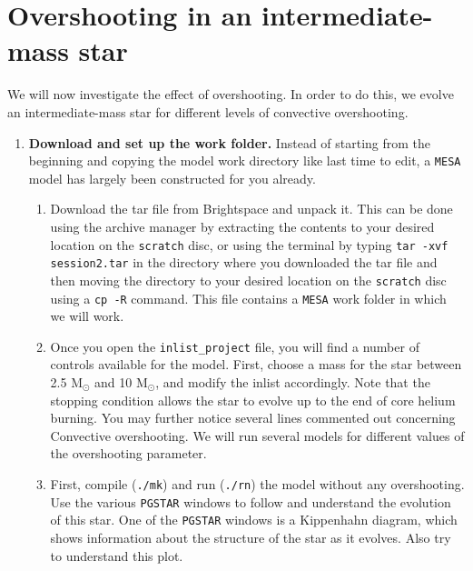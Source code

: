 \documentclass[11pt,a4paper]{article}
\begin{document}
\section{Overshooting in an intermediate-mass star}

We will now investigate the effect of overshooting. In order to do this, we evolve an intermediate-mass star for different levels of convective overshooting.


\begin{enumerate}

\item \textbf{Download and set up the work folder.} 
Instead of starting from the beginning and copying the model work directory like last time to edit, a \texttt{MESA} model has largely been constructed for you already. 


\begin{enumerate} 

    \item Download the tar file from Brightspace and unpack it. This can be done using the archive manager by extracting the contents to your desired location on the \texttt{scratch} disc, or using the terminal by typing \verb|tar -xvf session2.tar| in the directory where you downloaded the tar file and then moving the directory to your desired location on the \texttt{scratch} disc using a \texttt{cp -R} command. This file contains a \texttt{MESA} work folder in which we will work. 
    
    \item Once you open the \verb|inlist_project| file, you will find a number of controls available for the model. First, choose a mass for the star between 2.5 M$_\odot$ and 10 M$_\odot$, and modify the inlist accordingly. Note that the stopping condition allows the star to evolve up to the end of core helium burning. You may further notice several lines commented out concerning Convective overshooting. We will run several models for different values of the overshooting parameter. 

    \item First, compile (\verb|./mk|) and run (\verb|./rn|) the model without any overshooting. 
    Use the various \texttt{PGSTAR} windows to follow and understand the evolution of this star. One of the \texttt{PGSTAR} windows is a Kippenhahn diagram, which shows information about the structure of the star as it evolves. Also try to understand this plot.



\end{enumerate}
\end{enumerate}
\end{document}
